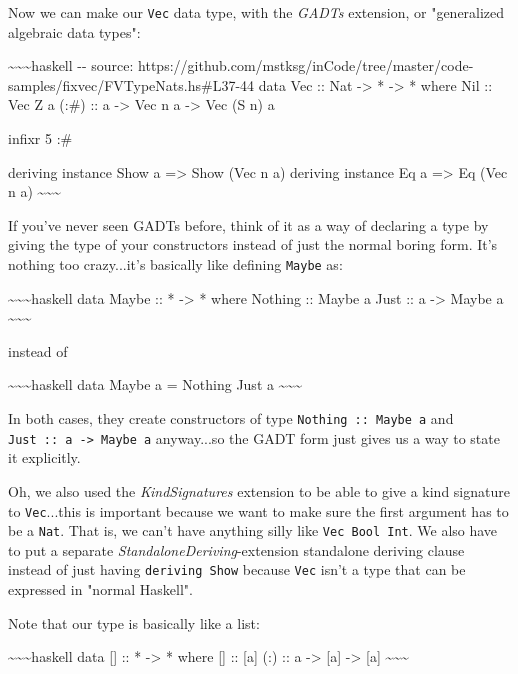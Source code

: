 \documentclass[]{article}
\begin{document}
Now we can make our \texttt{Vec} data type, with the \emph{GADTs} extension, or
"generalized algebraic data types":

\textasciitilde{}\textasciitilde{}\textasciitilde{}haskell -\/- source:
https://github.com/mstksg/inCode/tree/master/code-samples/fixvec/FVTypeNats.hs\#L37-44
data Vec :: Nat -\textgreater{} * -\textgreater{} * where Nil :: Vec Z a (:\#)
:: a -\textgreater{} Vec n a -\textgreater{} Vec (S n) a

infixr 5 :\#

deriving instance Show a =\textgreater{} Show (Vec n a) deriving instance Eq a
=\textgreater{} Eq (Vec n a) \textasciitilde{}\textasciitilde{}\textasciitilde{}

If you've never seen GADTs before, think of it as a way of declaring a type by
giving the type of your constructors instead of just the normal boring form.
It's nothing too crazy...it's basically like defining \texttt{Maybe} as:

\textasciitilde{}\textasciitilde{}\textasciitilde{}haskell data Maybe :: *
-\textgreater{} * where Nothing :: Maybe a Just :: a -\textgreater{} Maybe a
\textasciitilde{}\textasciitilde{}\textasciitilde{}

instead of

\textasciitilde{}\textasciitilde{}\textasciitilde{}haskell data Maybe a =
Nothing \textbar{} Just a \textasciitilde{}\textasciitilde{}\textasciitilde{}

In both cases, they create constructors of type \texttt{Nothing\ ::\ Maybe\ a}
and \texttt{Just\ ::\ a\ -\textgreater{}\ Maybe\ a} anyway...so the GADT form
just gives us a way to state it explicitly.

Oh, we also used the \emph{KindSignatures} extension to be able to give a kind
signature to \texttt{Vec}...this is important because we want to make sure the
first argument has to be a \texttt{Nat}. That is, we can't have anything silly
like \texttt{Vec\ Bool\ Int}. We also have to put a separate
\emph{StandaloneDeriving}-extension standalone deriving clause instead of just
having \texttt{deriving\ Show} because \texttt{Vec} isn't a type that can be
expressed in "normal Haskell".

Note that our type is basically like a list:

\textasciitilde{}\textasciitilde{}\textasciitilde{}haskell data {[}{]} :: *
-\textgreater{} * where {[}{]} :: {[}a{]} (:) :: a -\textgreater{} {[}a{]}
-\textgreater{} {[}a{]} \textasciitilde{}\textasciitilde{}\textasciitilde{}
\end{document}
